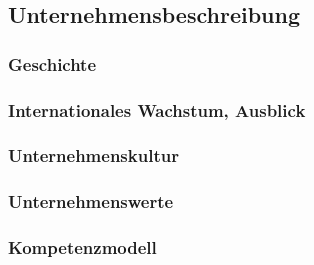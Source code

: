 \documentclass[../../main.tex]{subfiles}
\begin{document}
\subsection{Unternehmensbeschreibung}

\subsubsection{Geschichte}
\label{geschichte}


\subsubsection{Internationales Wachstum, Ausblick}
\label{internationales_wachstum}


\subsubsection{Unternehmenskultur}
\label{unternehmenskultur}


\subsubsection{Unternehmenswerte}
\label{unternehmenswerte}

    
\subsubsection{Kompetenzmodell}
\label{kompetenzmodell}

\end{document}
